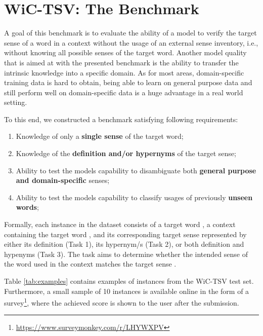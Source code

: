 \documentclass[11pt,a4paper]{article}
\begin{document}
\section{WiC-TSV: The Benchmark} 
\label{benchmark}



A goal of this benchmark is to evaluate the ability of a model to
verify the target sense of
a word in a context without the usage of an external sense inventory, i.e., without knowing all possible senses of the target word. Another model quality that is aimed at with the presented benchmark is the ability to transfer the intrinsic knowledge into a specific domain. As for most areas, domain-specific training data is hard to obtain, being able to learn on general purpose data and still perform well on domain-specific data is a huge advantage in a real world setting. 

To this end, we constructed a benchmark satisfying following requirements:
\begin{enumerate}
    \item Knowledge of only a \textbf{single sense} of the target word;\label{req1}
    \item Knowledge of the \textbf{definition and/or hypernyms} of the target sense; \label{req2}
    \item Ability to test the models capability to disambiguate both \textbf{general purpose and domain-specific} senses; \label{req3}
    \item Ability to test the models capability to classify usages of previously \textbf{unseen words};
    \label{req4}
\end{enumerate}






Formally, each instance in the dataset consists of a target word , a context  containing the target word , and its corresponding target sense  represented by either its definition (Task 1), its hypernym/s (Task 2), or both definition and hypenyms (Task 3). The task aims to determine whether the intended sense of the word  used in the context  matches the target sense . 

Table \ref{tab:examples} contains examples of instances from the WiC-TSV test set. Furthermore, a small sample of 10 
instances is available online in the form of a survey\footnote{\url{https://www.surveymonkey.com/r/LHYWXPV}}, where the achieved score is shown to the user after the submission.
\end{document}
